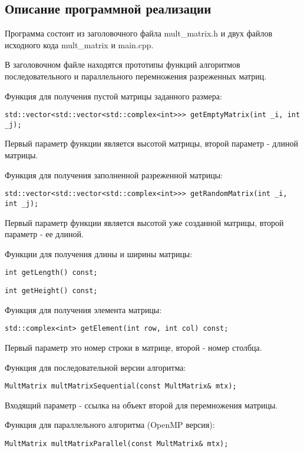 \documentclass{report}
\begin{document}
\begin{enumerate}
\section*{Описание программной реализации}
Программа состоит из заголовочного файла mult_matrix.h и двух файлов исходного кода mult_matrix и main.cpp.
\par В заголовочном файле находятся прототипы функций алгоритмов последовательного и параллельного перемножения разреженных матриц.
\par Функция для получения пустой матрицы заданного размера:
\begin{lstlisting}
std::vector<std::vector<std::complex<int>>> getEmptyMatrix(int _i, int _j);
\end{lstlisting}
Первый параметр функции является высотой матрицы, второй параметр - длиной матрицы.
\par Функция для получения заполненной разреженной матрицы:
\begin{lstlisting}
std::vector<std::vector<std::complex<int>>> getRandomMatrix(int _i, int _j);
\end{lstlisting}
Первый параметр функции является высотой уже созданной матрицы, второй параметр - ее длиной.
\par Функции для получения длины и ширины матрицы:
\begin{lstlisting}
int getLength() const;
\end{lstlisting}
\begin{lstlisting}
int getHeight() const;
\end{lstlisting}
\par Функция для получения элемента матрицы:
\begin{lstlisting}
std::complex<int> getElement(int row, int col) const;
\end{lstlisting}
Первый параметр это номер строки в матрице, второй - номер столбца.
\par Функция для последовательной версии алгоритма:
\begin{lstlisting}
MultMatrix multMatrixSequential(const MultMatrix& mtx);
\end{lstlisting}
Входящий параметр - ссылка на объект второй для перемножения матрицы.
\par Функция для параллельного алгоритма (OpenMP версия):
\begin{lstlisting}
MultMatrix multMatrixParallel(const MultMatrix& mtx);
\end{lstlisting}

\end{enumerate}
\end{document}
